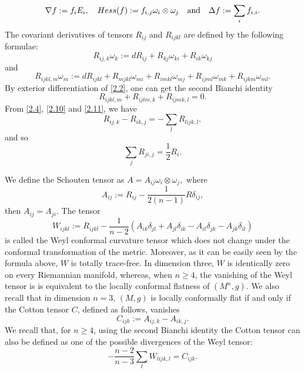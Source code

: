 \documentclass{amsart}
\theoremstyle{definition}
\theoremstyle{remark}
\numberwithin{equation}{section}
\begin{document}
\begin{equation}\label{2.8}
\nabla f:= f_{i}E_{i}, \quad  Hess(f):=f_{i,j}\omega_{i}\otimes \omega_{j} \quad {\rm and }\quad 
\Delta f:=\sum\limits_{i}f_{i,i}.
\end{equation}
The covariant derivatives of tensors $R_{ij}$ and $R_{ijkl}$
are defined by the following formulae:
\begin{equation}\label{2.9}
R_{ij,k}\omega_{k}:=dR_{ij}+R_{kj}\omega_{ki}+R_{ik}\omega_{kj}
\end{equation}
and
\begin{equation}\label{2.10}
R_{ijkl,m}\omega_{m}:=dR_{ijkl}+R_{mjkl}\omega_{mi}+
R_{imkl}\omega_{mj}+R_{ijml}\omega_{mk}+R_{ijkm}\omega_{ml}.
\end{equation}
By exterior differentiation of \eqref{2.2}, one can get the second Bianchi identity
\begin{equation}\label{2.11}
R_{ijkl,m}+R_{ijlm,k}+R_{ijmk,l}=0.
\end{equation}
From \eqref{2.4}, \eqref{2.10} and \eqref{2.11}, we have
\begin{equation}\label{2.12}
R_{ij,k}-R_{ik,j}=-\sum\limits_{l}R_{lijk,l},
\end{equation}
and so
\begin{equation}\label{2.13}
\sum\limits_{j}R_{ji,j}=\frac{1}{2}R_{i}.
\end{equation}

We define the Schouten tensor as
$A=A_{ij}\omega_{i}\otimes \omega_{j},$
where
\begin{equation}\label{2.14}
A_{ij}:=R_{ij}-\frac{1}{2(n-1)}R \delta_{ij},
\end{equation}
then $A_{ij}=A_{ji}$. The tensor
\begin{equation}\label{2.15}
W_{ijkl}:=R_{ijkl}-\frac{1}{n-2}
(A_{ik}\delta_{jl}+A_{jl}\delta_{ik}-
A_{il}\delta_{jk}-A_{jk}\delta_{il})
\end{equation}
is called the Weyl conformal curvature tensor which does not change under the conformal
transformation of the metric. Moreover, as it can be easily seen by the formula above,
$W$ is totally trace-free. 
In dimension three, $W$ is identically zero on every Riemannian manifold, whereas,
when $n\geq 4$, the vanishing of the Weyl tensor is
is equivalent to the locally conformal flatness of $(M^n,g)$. We also recall that in dimension $n=3$, 
$(M, g)$ is locally conformally flat if and only if the Cotton tensor $C$, defined as follows, vanishes
\begin{equation}\label{2.16}
C_{ijk} := A_{ij,k} - A_{ik,j}.
\end{equation} 
We recall that, for $n\geq 4$,  using the second Bianchi identity 
the Cotton tensor can also be defined as one of the possible divergences of the Weyl tensor:
\begin{equation}\label{2.17}
-\frac{n-2}{n-3}\sum\limits_{l} W_{lijk,l}= C_{ijk}.
\end{equation}
\end{document}
